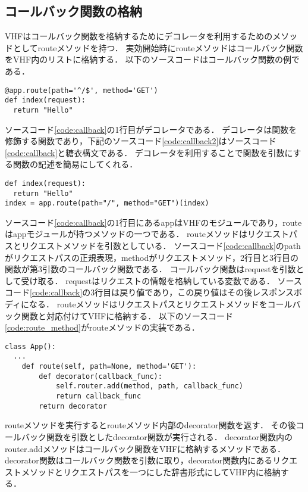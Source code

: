 \documentclass[a4paper,12pt]{jreport}
\begin{document}
\subsection{コールバック関数の格納}
VHFはコールバック関数を格納するためにデコレータを利用するためのメソッドとしてrouteメソッドを持つ．
実効開始時にrouteメソッドはコールバック関数をVHF内のリストに格納する．
以下のソースコードはコールバック関数の例である．
\begin{lstlisting}[caption={コールバック関数の一例}, label=code:callback, captionpos=b]
@app.route(path='^/$', method='GET')
def index(request):
  return "Hello"
\end{lstlisting}
ソースコード\ref{code:callback}の1行目がデコレータである．
デコレータは関数を修飾する関数であり，下記のソースコード\ref{code:callback2}はソースコード\ref{code:callback}と糖衣構文である．
デコレータを利用することで関数を引数にする関数の記述を簡易にしてくれる．
\begin{lstlisting}[caption={ソースコード\ref{code:callback}と糖衣な表現}, label=code:callback2, captionpos=b]
def index(request):
  return "Hello"
index = app.route(path="/", method="GET")(index)
\end{lstlisting}
ソースコード\ref{code:callback}の1行目にあるappはVHFのモジュールであり，routeはappモジュールが持つメソッドの一つである．
routeメソッドはリクエストパスとリクエストメソッドを引数としている．
ソースコード\ref{code:callback}のpathがリクエストパスの正規表現，methodがリクエストメソッド，2行目と3行目の関数が第3引数のコールバック関数である．
コールバック関数はrequestを引数として受け取る．
requestはリクエストの情報を格納している変数である．
ソースコード\ref{code:callback}の3行目は戻り値であり，この戻り値はその後レスポンスボディになる．
routeメソッドはリクエストパスとリクエストメソッドをコールバック関数と対応付けてVHFに格納する．
以下のソースコード\ref{code:route_method}がrouteメソッドの実装である．
\begin{lstlisting}[caption={routeメソッド}, label=code:route_method, captionpos=b]
class App():
  ...
    def route(self, path=None, method='GET'):
        def decorator(callback_func):
            self.router.add(method, path, callback_func)
            return callback_func
        return decorator
\end{lstlisting}
routeメソッドを実行するとrouteメソッド内部のdecorator関数を返す．
その後コールバック関数を引数としたdecorator関数が実行される．
decorator関数内のrouter.addメソッドはコールバック関数をVHFに格納するメソッドである．
decorator関数はコールバック関数を引数に取り，decorator関数内にあるリクエストメソッドとリクエストパスを一つにした辞書形式にしてVHF内に格納する．
\end{document}
